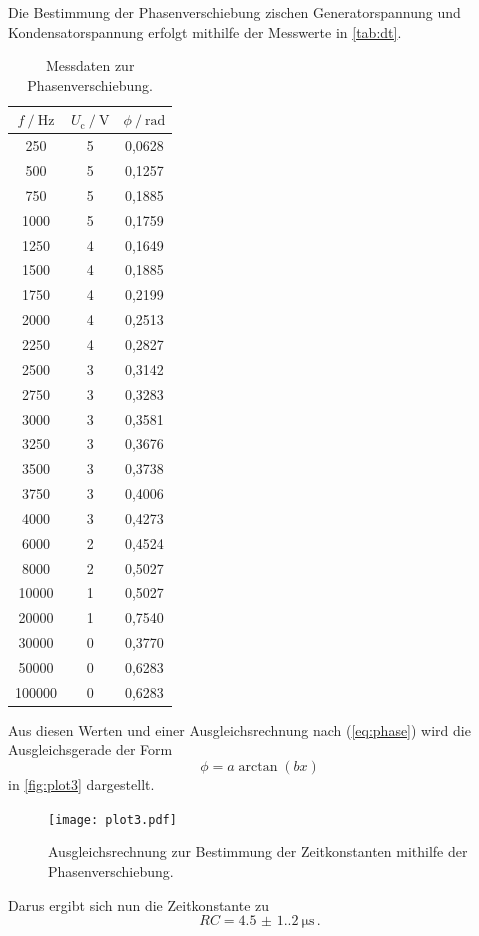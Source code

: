 Die Bestimmung der Phasenverschiebung zischen Generatorspannung und Kondensatorspannung erfolgt mithilfe der Messwerte in \autoref{tab:dt}.
\begin{table} [h]
  \centering
  \caption{Messdaten zur Phasenverschiebung.}
  \label{tab:dt}
  \begin{tabular}{c c c}
    \toprule
    $f \mathbin{/} \unit{\hertz}$ & $U_\text{c} \mathbin{/} \unit{\volt}$ & $\phi \mathbin{/} \mathrm{rad}$ \\
    \midrule
       250 &   5 &   0,0628 \\
       500 &   5 &   0,1257 \\
       750 &   5 &   0,1885 \\
      1000 &   5 &   0,1759 \\
      1250 &   4 &   0,1649 \\
      1500 &   4 &   0,1885 \\
      1750 &   4 &   0,2199 \\
      2000 &   4 &   0,2513 \\
      2250 &   4 &   0,2827 \\
      2500 &   3 &   0,3142 \\
      2750 &   3 &   0,3283 \\
      3000 &   3 &   0,3581 \\
      3250 &   3 &   0,3676 \\
      3500 &   3 &   0,3738 \\
      3750 &   3 &   0,4006 \\
      4000 &   3 &   0,4273 \\
      6000 &   2 &   0,4524 \\
      8000 &   2 &   0,5027 \\
     10000 &   1 &   0,5027 \\
     20000 &   1 &   0,7540 \\
     30000 &   0 &   0,3770 \\
     50000 &   0 &   0,6283 \\
    100000 &   0 &   0,6283 \\
    \bottomrule
  \end{tabular}
\end{table}

Aus diesen Werten und einer Ausgleichsrechnung nach (\ref{eq:phase}) wird die Ausgleichsgerade der Form
\begin{equation*}
  \phi=a \arctan (b x)
\end{equation*}
in \autoref{fig:plot3} dargestellt.
\begin{figure}[H]
  \centering
  \texttt{[image: plot3.pdf]}
  \caption{Ausgleichsrechnung zur Bestimmung der Zeitkonstanten mithilfe der Phasenverschiebung.}
  \label{fig:plot3}
\end{figure}
Darus ergibt sich nun die Zeitkonstante zu
\begin{equation*}
  RC = \qty{4.5(1.2)}{\micro\second} \, .
\end{equation*}

